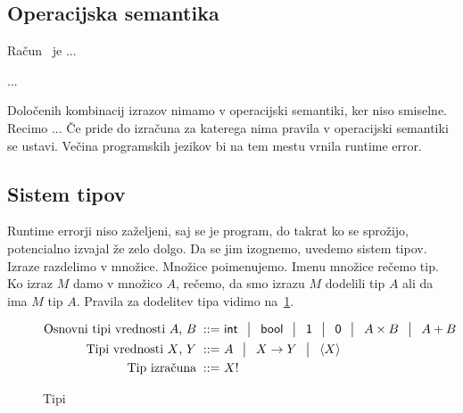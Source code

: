 \documentclass[12pt,a4paper,twoside]{article}
\theoremstyle{definition} %
\theoremstyle{plain} %
\numberwithin{equation}{section}  %
\begin{document}


\subsection{Operacijska semantika}

Račun \lae\ je ...

...

Določenih kombinacij izrazov nimamo v operacijski semantiki, ker niso smiselne. Recimo ...
Če \lae pride do izračuna za katerega nima pravila v operacijski semantiki se ustavi. Večina programskih jezikov bi na tem mestu vrnila runtime error.

\subsection{Sistem tipov}

Runtime errorji niso zaželjeni, saj se je program, do takrat ko se sprožijo, potencialno izvajal že zelo dolgo.
Da se jim izognemo, uvedemo sistem tipov. Izraze razdelimo v množice. Množice poimenujemo. Imenu množice rečemo tip. Ko izraz $M$ damo v množico $A$, rečemo, da smo izrazu $M$ dodelili tip $A$ ali da ima $M$ tip $A$. 
Pravila za dodelitev tipa vidimo na~\ref{fig:tipi}.




\begin{figure}[tb]
	\parbox{\textwidth}{
		\centering
		\small
		\begin{align*}
		\text{Osnovni tipi vrednosti $A$, $B$}
		\bnfis& \tysym{int} \,\bnfor\! \tysym{bool} \,\bnfor\! \tyunit \,\bnfor\! \tyempty \,\bnfor\! \typrod{A}{B} \,\bnfor\! \tysum{A}{B}
		\\%
		\text{Tipi vrednosti $X$, $Y$}
		\bnfis& A \,\bnfor\! \tyfun{X}{Y} \,\bnfor\! \typromise{X}
		\\
		\text{Tip izračuna} \bnfis& \tycomp{X}
		\end{align*}
	} 
	\caption{Tipi}
	\label{fig:tipi}
\end{figure}
\end{document}
